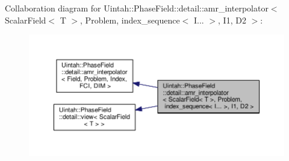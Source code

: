 Collaboration diagram for Uintah\+:\+:Phase\+Field\+:\+:detail\+:\+:amr\+\_\+interpolator$<$ Scalar\+Field$<$ T $>$, Problem, index\+\_\+sequence$<$ I... $>$, I1, D2 $>$\+:\nopagebreak
\begin{figure}[H]
\begin{center}
\leavevmode
\includegraphics[width=350pt]{classUintah_1_1PhaseField_1_1detail_1_1amr__interpolator_3_01ScalarField_3_01T_01_4_00_01Problemcb8cbfe24988b8a6e1f5e685c48d5546}
\end{center}
\end{figure}
